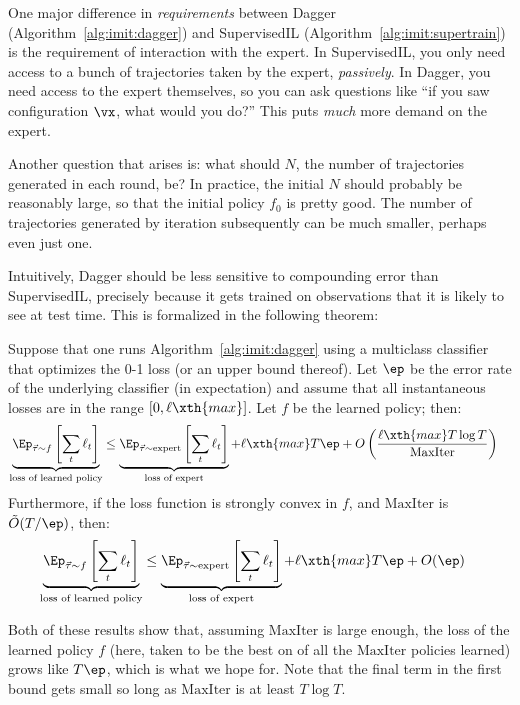 One major difference in \emph{requirements} between Dagger (Algorithm~\ref{alg:imit:dagger}) and SupervisedIL (Algorithm~\ref{alg:imit:supertrain}) is the requirement of interaction with the expert.
In SupervisedIL, you only need access to a bunch of trajectories taken by the expert, \emph{passively}.
In Dagger, you need access to the expert themselves, so you can ask questions like ``if you saw configuration $\vx$, what would you do?''
This puts \emph{much} more demand on the expert.

Another question that arises is: what should $N$, the number of trajectories generated in each round, be?
In practice, the initial $N$ should probably be reasonably large, so that the initial policy $f_0$ is pretty good.
The number of trajectories generated by iteration subsequently can be much smaller, perhaps even just one.

Intuitively, Dagger should be less sensitive to compounding error than SupervisedIL, precisely because it gets trained on observations that it is likely to see at test time.
This is formalized in the following theorem:

\begin{theorem}
  Suppose that one runs Algorithm~\ref{alg:imit:dagger} using a multiclass classifier that optimizes the 0-1 loss (or an upper bound thereof).
  Let $\ep$ be the error rate of the underlying classifier (in expectation) and assume that all instantaneous losses are in the range $[0, \ell\xth{max}]$.
  Let $f$ be the learned policy; then:
  \begin{align}
    \underbrace{\Ep_{\vt \sim f}\left[\sum_t \ell_t\right]}_{\text{loss of learned policy}}
    & \leq
    \underbrace{\Ep_{\vt \sim \text{expert}}\left[\sum_t \ell_t\right]}_{\text{loss of expert}}
      + \ell\xth{max} T \ep
      + O\left( \frac {\ell\xth{max} T \log T} {\text{MaxIter}} \right)
  \end{align}
  Furthermore, if the loss function is strongly convex in $f$, and $\text{MaxIter}$ is $\tilde O(T/\ep)$, then:
  \begin{align}
    \underbrace{\Ep_{\vt \sim f}\left[\sum_t \ell_t\right]}_{\text{loss of learned policy}}
    & \leq
    \underbrace{\Ep_{\vt \sim \text{expert}}\left[\sum_t \ell_t\right]}_{\text{loss of expert}}
      + \ell\xth{max} T \ep
      + O(\ep)
  \end{align}
\end{theorem}

Both of these results show that, assuming $\text{MaxIter}$ is large enough, the loss of the learned policy $f$ (here, taken to be the best on of all the $\text{MaxIter}$ policies learned) grows like $T\ep$, which is what we hope for.
Note that the final term in the first bound gets small so long as $\text{MaxIter}$ is at least $T \log T$.

